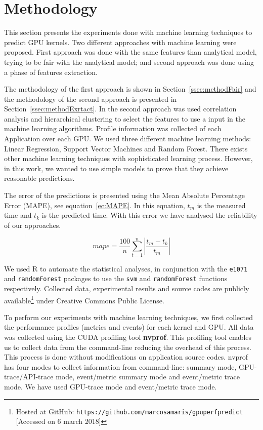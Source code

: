 \section{Methodology}\label{sec:method-ML}
This section presents the experiments done with machine learning techniques to predict GPU kernels. Two different approaches with machine learning were proposed. First approach was done with the same features than analytical model, trying to be fair with the analytical model; and second approach was done using a phase of features extraction. 

The methodology of the first approach is shown in Section~\ref{ssec:methodFair} and the methodology of the second approach is presented in Section~\ref{ssec:methodExrtact}. 
In the second approach was used correlation analysis and hierarchical clustering to select the features to use a input in the machine learning algorithms. Profile information was collected of each Application over each GPU. 
We used three different machine learning methods: Linear Regression, Support Vector Machines and Random Forest. 
There exists other machine learning techniques with sophisticated learning process. However, in this work, we wanted to use simple models to prove that they achieve reasonable predictions.

The error of the predictions is presented using the Mean Absolute Percentage Error (MAPE), see equation~\ref{ec:MAPE}. In this equation, $t_m$ is the measured time and $t_k$ is the predicted time. With this error we have analysed the reliability of our approaches. 

\begin{equation}
    mape = \frac{100}{n}\sum _{t=1}^{n}\left|{\frac {{t_m}-{t_k}}{{t_m}}}\right| \label{ec:MAPE}
\end{equation}

We used R to automate the statistical analyses, in conjunction with the \texttt{e1071} and \texttt{randomForest} packages to use the \texttt{svm} and \texttt{randomForest} functions respectively. Collected data, experimental results and source codes are publicly available\footnote{Hosted at GitHub: \texttt{\scriptsize https://github.com/marcosamaris/gpuperfpredict} [Accessed on 6 march 2018]} under Creative Commons Public License. 

To perform our experiments with machine learning techniques, we first collected the performance profiles (metrics and events) for each kernel and GPU. 
All data was collected using the CUDA profiling tool \textbf{nvprof}. This profiling tool enables us to collect data from the command-line reducing the overhead of this process. This process is done without modifications on application source codes. nvprof has four modes to collect information from command-line: summary mode, GPU-trace/API-trace mode, event/metric summary mode and event/metric trace mode. We have used GPU-trace mode and event/metric trace mode.

